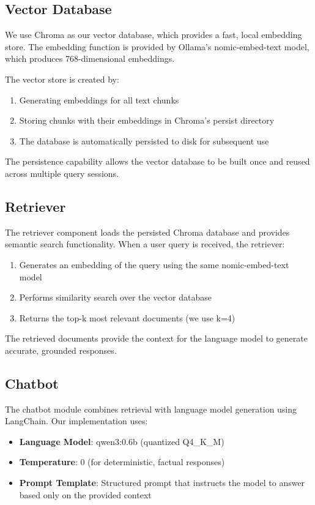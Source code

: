 \documentclass[conference]{IEEEtran}
\begin{document}
\subsection{Vector Database}
We use Chroma as our vector database, which provides a fast, local embedding store. The embedding function is provided by Ollama's nomic-embed-text model, which produces 768-dimensional embeddings.

The vector store is created by:

\begin{enumerate}
    \item Generating embeddings for all text chunks
    \item Storing chunks with their embeddings in Chroma's persist directory
    \item The database is automatically persisted to disk for subsequent use
\end{enumerate}

The persistence capability allows the vector database to be built once and reused across multiple query sessions.

\subsection{Retriever}
The retriever component loads the persisted Chroma database and provides semantic search functionality. When a user query is received, the retriever:

\begin{enumerate}
    \item Generates an embedding of the query using the same nomic-embed-text model
    \item Performs similarity search over the vector database
    \item Returns the top-k most relevant documents (we use k=4)
\end{enumerate}

The retrieved documents provide the context for the language model to generate accurate, grounded responses.

\subsection{Chatbot}
The chatbot module combines retrieval with language model generation using LangChain. Our implementation uses:

\begin{itemize}
    \item \textbf{Language Model}: qwen3:0.6b (quantized Q4\_K\_M)
    \item \textbf{Temperature}: 0 (for deterministic, factual responses)
    \item \textbf{Prompt Template}: Structured prompt that instructs the model to answer based only on the provided context
\end{itemize}
\end{document}
